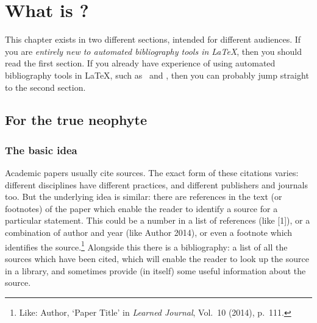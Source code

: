 \chapter{What is ?}

This chapter exists in two different sections, intended for different audiences. If you are \emph{entirely new to automated bibliography tools in \LaTeX}, then you should read the first section. If you already have experience of using automated bibliography tools in \LaTeX, such as \bibtex\ and , then you can probably jump straight to the second section.

\section{For the true neophyte}

\subsection{The basic idea}

Academic papers usually cite sources. The exact form of these citations varies: different disciplines have different practices, and different publishers and journals too. But the underlying idea is similar: there are references in the text (or footnotes) of the paper which enable the reader to identify a source for a particular statement. This could be a number in a list of references (like [1]), or a combination of author and year (like Author 2014), or even a footnote which identifies the source.\footnote{Like: Author, `Paper Title' in \emph{Learned Journal}, Vol.\ 10 (2014), p.\ 111.} Alongside this there is a bibliography: a list of all the sources which have been cited, which will enable the reader to look up the source in a library, and sometimes provide (in itself) some useful information about the source.

